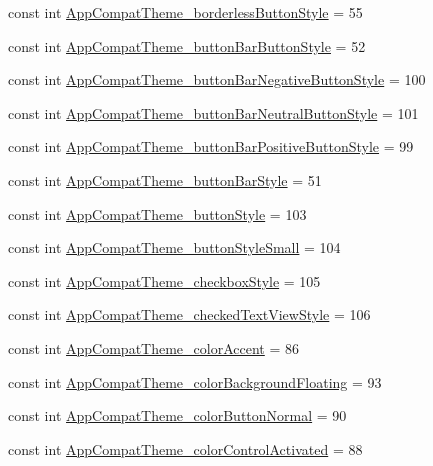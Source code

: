 \begin{CompactItemize}
\item 
const int \hyperlink{class__2doo_1_1_droid_1_1_resource_1_1_styleable_6d12b607eec29de3e2492ab2272f3562}{AppCompatTheme\_\-borderlessButtonStyle} = 55
\item 
const int \hyperlink{class__2doo_1_1_droid_1_1_resource_1_1_styleable_6347c0abec02a5d99070bbce0a694082}{AppCompatTheme\_\-buttonBarButtonStyle} = 52
\item 
const int \hyperlink{class__2doo_1_1_droid_1_1_resource_1_1_styleable_486eeb028f5cdc333914a011bdfde62e}{AppCompatTheme\_\-buttonBarNegativeButtonStyle} = 100
\item 
const int \hyperlink{class__2doo_1_1_droid_1_1_resource_1_1_styleable_85c2fa172c0d17becd06724456ac96c2}{AppCompatTheme\_\-buttonBarNeutralButtonStyle} = 101
\item 
const int \hyperlink{class__2doo_1_1_droid_1_1_resource_1_1_styleable_ed2ce65c05fde3450cff1922a8ce3d0b}{AppCompatTheme\_\-buttonBarPositiveButtonStyle} = 99
\item 
const int \hyperlink{class__2doo_1_1_droid_1_1_resource_1_1_styleable_bf57c247defdc3c77f07152eb1de8acf}{AppCompatTheme\_\-buttonBarStyle} = 51
\item 
const int \hyperlink{class__2doo_1_1_droid_1_1_resource_1_1_styleable_02f901e957bb6643d27152376347803a}{AppCompatTheme\_\-buttonStyle} = 103
\item 
const int \hyperlink{class__2doo_1_1_droid_1_1_resource_1_1_styleable_9d909cc984367557b8a1e8427f05fa3c}{AppCompatTheme\_\-buttonStyleSmall} = 104
\item 
const int \hyperlink{class__2doo_1_1_droid_1_1_resource_1_1_styleable_7d09efe373a95877ec3616349505de02}{AppCompatTheme\_\-checkboxStyle} = 105
\item 
const int \hyperlink{class__2doo_1_1_droid_1_1_resource_1_1_styleable_25e9ff9b340dc718c35960c4f06c73ca}{AppCompatTheme\_\-checkedTextViewStyle} = 106
\item 
const int \hyperlink{class__2doo_1_1_droid_1_1_resource_1_1_styleable_1782c1de0d176feadb9a938c5335a024}{AppCompatTheme\_\-colorAccent} = 86
\item 
const int \hyperlink{class__2doo_1_1_droid_1_1_resource_1_1_styleable_b809f1a46b7b12c1208110125456829a}{AppCompatTheme\_\-colorBackgroundFloating} = 93
\item 
const int \hyperlink{class__2doo_1_1_droid_1_1_resource_1_1_styleable_39802113dc47028fb8169a6a00777111}{AppCompatTheme\_\-colorButtonNormal} = 90
\item 
const int \hyperlink{class__2doo_1_1_droid_1_1_resource_1_1_styleable_4fe09c2b54d62badbe7cf6c9dc691511}{AppCompatTheme\_\-colorControlActivated} = 88

\end{CompactItemize}
